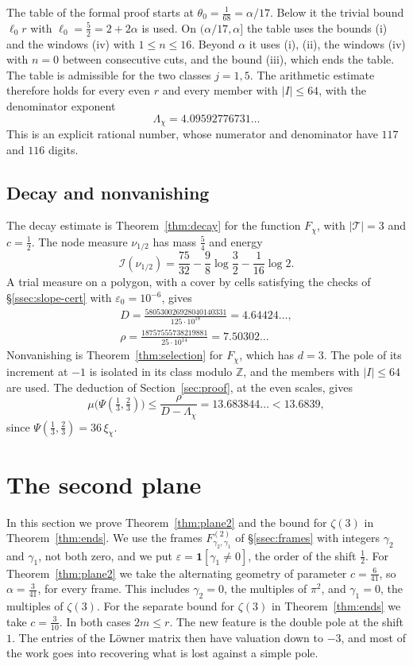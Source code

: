 \documentclass[11pt]{amsart}
\theoremstyle{definition}
\theoremstyle{remark}
\numberwithin{equation}{section}
\newcommand{\Z}{\mathbb Z}
\newcommand{\cI}{\mathcal I}
\newcommand{\MuChi}{13.6839}
\newcommand{\MuChiExact}{13.683844}
\begin{document}
The table of the formal proof starts at $\theta_0=\frac1{68}=\alpha/17$. Below it the trivial bound $\ell_0r$ with
$\ell_0=\frac52=2+2\alpha$ is used. On $(\alpha/17,\alpha]$ the table uses the bounds (i) and the windows (iv) with
$1\le n\le16$. Beyond $\alpha$ it uses (i), (ii), the windows (iv) with $n=0$ between consecutive cuts, and the bound
(iii), which ends the table. The table is admissible for the two classes $j=1,5$. The arithmetic estimate therefore
holds for every even $r$ and every member with $|I|\le64$, with the denominator exponent
\[
 \Lambda_\chi=4.09592776731\ldots
\]
This is an explicit rational number, whose numerator and denominator have $117$ and $116$ digits.

\subsection{Decay and nonvanishing}
The decay estimate is Theorem~\ref{thm:decay} for the function $F_\chi$, with $|\mathcal T|=3$ and $c=\frac12$. The node
measure $\nu_{1/2}$ has mass $\frac54$ and energy
\[
 \cI(\nu_{1/2})=\frac{75}{32}-\frac98\log\frac32-\frac1{16}\log2 .
\]
A trial measure on a polygon, with a cover by cells satisfying the checks of \S\ref{ssec:slope-cert} with
$\varepsilon_0=10^{-6}$, gives
\[
\begin{gathered}
 D=\frac{580530026928040140331}{125\cdot10^{18}}=4.64424\ldots,\\ \rho=\frac{18757555738219881}{25\cdot10^{14}}=7.50302\ldots
\end{gathered}
\]
Nonvanishing is Theorem~\ref{thm:selection} for $F_\chi$, which has $d=3$. The pole of its increment at $-1$ is
isolated in its class modulo $\Z$, and the members with $|I|\le64$ are used. The deduction of Section~\ref{sec:proof}, at the even scales, gives
\[
 \mu\bigl(\Psi(\tfrac13,\tfrac23)\bigr)\le\frac\rho{D-\Lambda_\chi}=\MuChiExact\ldots<\MuChi,
\]
since $\Psi(\frac13,\frac23)=36\,\xi_\chi$.

\section{The second plane}\label{sec:plane2}

In this section we prove Theorem~\ref{thm:plane2} and the bound for $\zeta(3)$ in Theorem~\ref{thm:ends}. We use the
frames $F^{(2)}_{\gamma_2,\gamma_1}$ of \S\ref{ssec:frames} with integers $\gamma_2$ and $\gamma_1$, not both zero, and
we put $\varepsilon=\mathbf 1[\gamma_1\ne0]$, the order of the shift $\frac12$. For Theorem~\ref{thm:plane2} we take
the alternating geometry of parameter $c=\frac6{41}$, so $\alpha=\frac3{41}$, for every frame. This includes
$\gamma_2=0$, the multiples of $\pi^2$, and $\gamma_1=0$, the multiples of $\zeta(3)$. For the separate bound for
$\zeta(3)$ in Theorem~\ref{thm:ends} we take $c=\frac3{10}$. In both cases $2m\le r$. The new feature is the double pole
at the shift $1$. The entries of the L\"owner matrix then have valuation down to $-3$, and most of the work goes into
recovering what is lost against a simple pole.
\end{document}
